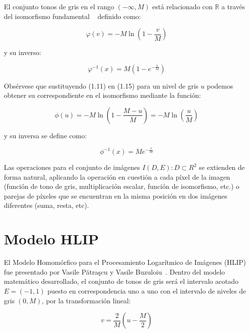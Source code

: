 El conjunto tonos de gris en el rango $(-\infty, M)$ está relacionado con $\mathbb{R}$ a través del isomorfismo fundamental ~\cite{jourlin2016logarithmic} definido como:

\begin{equation}
	\varphi(v) = -M\ln\left(1-\frac{v}{M}\right)
\end{equation}

y su inverso:

\begin{equation}
	\varphi^{-1} (x) = M\left(1-e^{-\frac{x}{M}}\right)
\end{equation}


Obs\'ervese que sustituyendo (1.11) en (1.15) para un nivel de gris $u$ podemos obtener su correspondiente en el isomorfismo mediante la funci\'on:

\begin{equation}
	\phi(u) = -M\ln\left(1-\frac{M-u}{M}\right) = -M\ln\left(\frac{u}{M}\right)
\end{equation}

y su inversa se define como:

\begin{equation}
	\phi^{-1}(x) = Me^{-\frac{x}{M}} 
\end{equation}

Las operaciones para el conjunto de im\'agenes $I(D,E):D\subset R^2$ se extienden de forma natural, aplicando la operaci\'on en cuesti\'on a cada p\'ixel de la imagen (funci\'on de tono de gris, multiplicaci\'on escalar, funci\'on de isomorfismo, etc.) o parejas de p\'ixeles que se encuentran en la misma posici\'on en dos im\'agenes diferentes (suma, resta, etc). 

\section{Modelo HLIP}

El Modelo Homom\'orfico para el Procesamiento Logar\'itmico de Im\'agenes (HLIP) fue presentado por Vasile Pătraşcu y Vasile Buzuloiu~\cite{patrascu2014mathematical}. Dentro del modelo matemático desarrollado, el conjunto de tonos de gris será el intervalo acotado $E = (-1, 1)$ puesto en correspondencia uno a uno con el intervalo de niveles de gris $(0,M)$, por la transformaci\'on lineal:

\begin{equation}
	v=\frac{2}{M}\left(u-\frac{M}{2}\right)
\end{equation}

